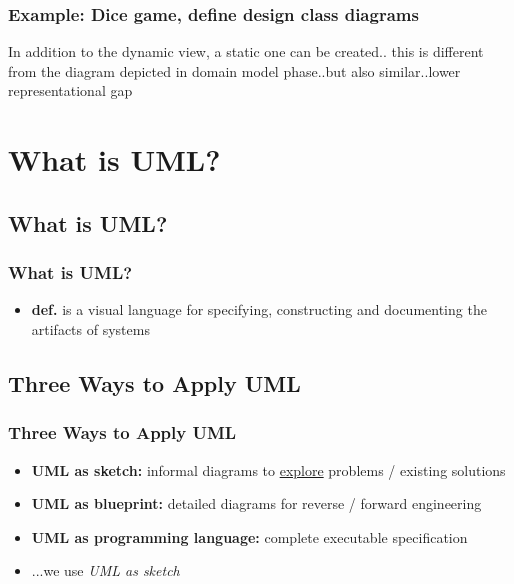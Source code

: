 \documentclass{beamer}
\begin{document}
\begin{frame}
	\frametitle{Example: Dice game, define design class diagrams}
In addition to the dynamic view, a static one can be created.. this is different from the diagram depicted in domain model phase..but also similar..lower representational gap
	\begin{center}
	\end{center}
\end{frame}

\section{What is UML?}
\subsection{What is UML?}
\begin{frame}
	\frametitle{What is UML?}
	\begin{itemize}
		\item<+-> \textbf{def.} is a visual language for specifying, constructing and documenting the artifacts of systems
    \end{itemize}
\end{frame}


\subsection{Three Ways to Apply UML}
\begin{frame}
	\frametitle{Three Ways to Apply UML}
	\begin{itemize}
		\item<+-> \textbf{UML as sketch:} informal diagrams to \underline{explore} problems / existing solutions
		\item<+-> \textbf{UML as blueprint:} detailed diagrams for reverse / forward engineering
		\item<+-> \textbf{UML as programming language:} complete executable specification
		\item<+-> ...we use \textit{UML as sketch}
    \end{itemize}
\end{frame}
\end{document}
